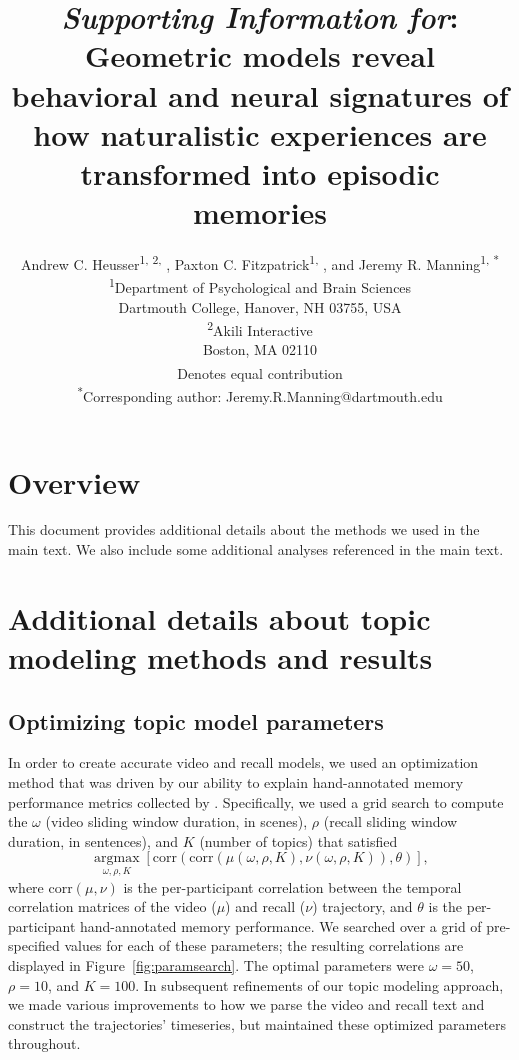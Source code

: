 \documentclass{article}
\title{\textit{Supporting Information for}: Geometric models reveal behavioral and neural signatures of how naturalistic experiences are transformed into episodic memories}
\author{Andrew C. Heusser\textsuperscript{1, 2, \textdagger}, Paxton C. Fitzpatrick\textsuperscript{1, \textdagger}, and Jeremy R. Manning\textsuperscript{1, *}\\\textsuperscript{1}Department of Psychological and Brain Sciences\\Dartmouth College, Hanover, NH 03755, USA\\\textsuperscript{2}Akili Interactive\\Boston, MA 02110\\\textsuperscript{\textdagger}Denotes equal contribution\\\textsuperscript{*}Corresponding author: Jeremy.R.Manning@dartmouth.edu}
\newcommand{\argmax}{\mathop{\mathrm{argmax}}\limits}
\begin{document}
\maketitle

\setcounter{equation}{0}
\setcounter{figure}{0}
\setcounter{table}{0}
\setcounter{page}{1}
\setcounter{section}{0}
\makeatletter
\renewcommand{\theequation}{S\arabic{equation}}
\renewcommand{\thefigure}{S\arabic{figure}}
\renewcommand{\bibnumfmt}[1]{[S#1]}
\renewcommand{\citenumfont}[1]{S#1}


\section*{Overview}
This document provides additional details about the methods we used in the main text.  We also include some additional analyses referenced in the main text.

\section*{Additional details about topic modeling methods and results}
\subsection*{Optimizing topic model parameters}
In order to create accurate video and recall models, we used an optimization method that was driven by our ability to explain hand-annotated memory performance metrics collected by \cite{ChenEtal17}.  Specifically, we used a grid search to compute the $\omega$ (video sliding window duration, in scenes), $\rho$ (recall sliding window duration, in sentences), and $K$ (number of topics) that satisfied
\[
\argmax_{\omega, \rho, K} \left[\mathrm{corr}\left(\mathrm{corr}\left(\mu\left(\omega, \rho, K\right), \nu\left(\omega, \rho, K\right)\right), \theta\right)\right],
\]
where $\mathrm{corr}(\mu, \nu)$ is the per-participant correlation between the temporal correlation matrices of the video ($\mu$) and recall ($\nu$) trajectory, and $\theta$ is the per-participant hand-annotated memory performance.  We searched over a grid of pre-specified values for each of these parameters; the resulting correlations are displayed in Figure~\ref{fig:paramsearch}.  The optimal parameters were $\omega = 50$, $\rho = 10$, and $K = 100$. In subsequent refinements of our topic modeling approach, we made various improvements to how we parse the video and recall text and construct the trajectories' timeseries, but maintained these optimized parameters throughout.
\end{document}
